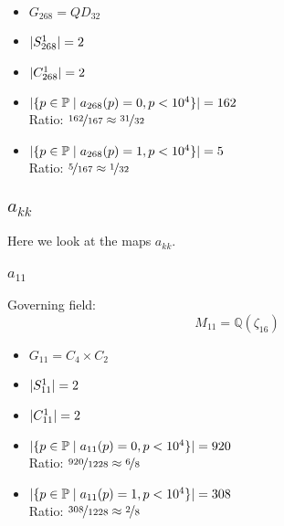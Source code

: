 \begin{multicols}{2}
	\begin{itemize}
		\item $G_{268} = QD_{32}$
		\item $| S_{268}^1 | = 2$
		\item $| C_{268}^1 | = 2$
	\end{itemize}
	\begin{itemize}
		\item $| \{ p \in \mathbb{P} \mid a_{268}(p)=0, p<10^4 \} | = 162$\\
		Ratio: $\nicefrac{ 162 }{ 167 } \approx \nicefrac{ 31 }{ 32 }$
		\item $| \{ p \in \mathbb{P} \mid a_{268}(p)=1, p<10^4 \} | = 5$\\
		Ratio: $\nicefrac{ 5 }{ 167 } \approx \nicefrac{ 1 }{ 32 }$
	\end{itemize}
\end{multicols}



\subsection{$a_{kk}$}
Here we look at the maps $a_{kk}$.

\subsubsection{$a_{11}$}
Governing field:
$$M_{11} = \mathbb{Q}\left(\zeta_{16}\right)$$
\begin{multicols}{2}
	\begin{itemize}
		\item $G_{11} = C_4 \times C_2$
		\item $| S_{11}^1 | = 2$
		\item $| C_{11}^1 | = 2$
	\end{itemize}
	\begin{itemize}
		\item $| \{ p \in \mathbb{P} \mid a_{11}(p)=0, p<10^4 \} | = 920$\\
		Ratio: $\nicefrac{ 920 }{ 1228 } \approx \nicefrac{ 6 }{ 8 }$
		\item $| \{ p \in \mathbb{P} \mid a_{11}(p)=1, p<10^4 \} | = 308$\\
		Ratio: $\nicefrac{ 308 }{ 1228 } \approx \nicefrac{ 2 }{ 8 }$
	\end{itemize}
\end{multicols}



